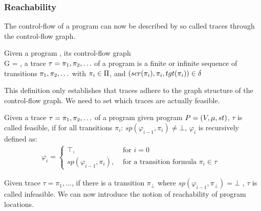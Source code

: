 \subsubsection{Reachability}
The control-flow of a program can now be described by so called traces through the control-flow graph.
\begin{mydef}
	Given a program	\prg, its control-flow graph \\ G = \cfg, a trace $\tau = \pi_1, \pi_2, \ldots $ of a program is a finite or infinite sequence of transitions $\pi_1, \pi_2, \ldots$ with $\pi_i \in \Pi$, and $(scr(\pi_i), \pi_i, tgt(\pi_i)) \in \delta$
\end{mydef}
This definition only establishes that traces adhere to the graph structure of the control-flow graph. We need to set which traces are actually feasible.
\begin{mydef}
	Given a trace $\tau = \pi_1, \pi_2, \ldots $ of a program given program $P = (V, \mu, st)$, $\tau$ is called feasible, if for all transitions $\pi_i$: $sp(\varphi_{i-1}, \pi_i) \neq \bot$, $\varphi_i$ is recursively defined as: 
	\begin{align*}
		\varphi_i = 
		\begin{cases}
			\textbf{$\top$}, & \text{ for } i = 0 \\
			\textbf{$sp(\varphi_{i-1}, \pi_i)$}, & \text{ for a transition formula $\pi_i \in \tau$ }
		\end{cases}
	\end{align*}
\end{mydef}
Given trace $\tau = \pi_1, \ldots$, if there is a transition $\pi_{\bot}$ where $sp(\varphi_{i-1}, \pi_{\bot}) = \bot$ , $\tau$ is called infeasible. We can now introduce the notion of reachability of program locations.
\begin{comment}
	\begin{mydef}[Reachability]
	Given a control-flow graph $\cfg$, we introduce a map $reach: Loc \mapsto \{\varphi\}$ that maps each program location $\ell_i \in Loc$ to a set of states, defined by first order logic formula $\varphi_i$, that are reachable from $\ell_i$. The set of states $\{\varphi_i\}$ is defined as the union $\bigcup\limits_{}^{\tau_j} sp(\varphi_{k-1}, \pi_k)$ for given traces $\tau_j = \pi_1, \ldots, \pi_k$ where $tgt(\pi_k) = \ell_i$. A program location $\ell_i$ is called reachable, if $reach(\ell_i) \neq \{\bot\}$, otherwise $\ell_i$ is called unreachable.
	\end{mydef}
\end{comment}

